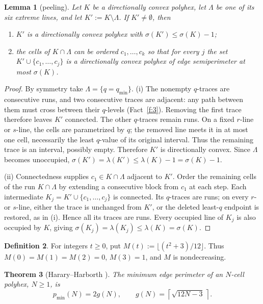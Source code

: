 \documentclass[11pt]{article}
\theoremstyle{plain}
\newtheorem{theorem}{Theorem}[section]
\newtheorem{lemma}[theorem]{Lemma}
\theoremstyle{definition}
\newtheorem{definition}[theorem]{Definition}
\theoremstyle{remark}
\newcommand{\sm}{\setminus}
\begin{document}
\begin{lemma}[peeling]\label{lem:peel}
Let \(K\) be a directionally convex polyhex, let \(\Lambda\) be one of its six extreme
lines, and let \(K':=K\sm\Lambda\). If \(K'\neq\emptyset\), then
\begin{enumerate}
\item[(i)] \(K'\) is a directionally convex polyhex with \(\sigma(K')\le\sigma(K)-1\);
\item[(ii)] the cells of \(K\cap\Lambda\) can be ordered \(c_{1},\dots,c_{k}\) so that for
every \(j\) the set \(K'\cup\{c_{1},\dots,c_{j}\}\) is a directionally convex polyhex of
edge semiperimeter at most \(\sigma(K)\).
\end{enumerate}
\end{lemma}

\begin{proof}
By symmetry take \(\Lambda=\{q=q_{\min}\}\).
(i) The nonempty \(q\)-traces are consecutive runs, and two consecutive
traces are adjacent: any path between them must cross between their
\(q\)-levels (Fact~\ref{f:3}). Removing the first trace therefore leaves
\(K'\) connected. The other \(q\)-traces remain runs. On a fixed
\(r\)-line or \(s\)-line, the cells are parametrized by \(q\);
the removed line meets it in at most one cell, necessarily the least
\(q\)-value of its original interval. Thus the remaining trace is
an interval, possibly empty. Therefore \(K'\) is directionally convex.
Since \(\Lambda\) becomes unoccupied,
\(\sigma(K')=\lambda(K')\le\lambda(K)-1=\sigma(K)-1\).

(ii) Connectedness supplies \(c_1\in K\cap\Lambda\) adjacent to \(K'\).
Order the remaining cells of the run \(K\cap\Lambda\) by extending
a consecutive block from \(c_1\) at each step. Each intermediate
\(K_j=K'\cup\{c_1,\dots,c_j\}\) is connected. Its \(q\)-traces
are runs; on every \(r\)- or \(s\)-line, either the trace is
unchanged from \(K'\), or the deleted least-\(q\) endpoint is restored,
as in (i). Hence all its traces are runs. Every occupied line
of \(K_j\) is also occupied by \(K\), giving
\(\sigma(K_j)=\lambda(K_j)\le\lambda(K)=\sigma(K)\).
\end{proof}

\begin{definition}\label{def:M}
For integers \(t\ge0\), put \(M(t):=\lfloor(t^2+3)/12\rfloor\).
Thus \(M(0)=M(1)=M(2)=0\), \(M(3)=1\), and \(M\) is nondecreasing.
\end{definition}

\begin{theorem}[Harary--Harborth \cite{HararyHarborth1976}]\label{thm:knownperimeter}
The minimum edge perimeter of an \(N\)-cell polyhex, \(N\ge1\), is
\[
p_{\min}(N)=2g(N),\qquad g(N)=\left\lceil\sqrt{12N-3}\,\right\rceil .
\]
\end{theorem}
\end{document}

